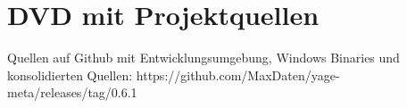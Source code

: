 \chapter[DVD mit Projektquellen]{DVD mit Projektquellen}

Quellen auf Github mit Entwicklungsumgebung, Windows Binaries und konsolidierten Quellen:
https://github.com/MaxDaten/yage-meta/releases/tag/0.6.1
